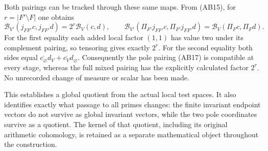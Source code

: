 Both pairings can be tracked through these same maps. From (AB15),
for $r=|F'\setminus F|$ one obtains
\[
 \mathscr B_{V'}(j_{FF'}c,j_{FF'}d)=2^r\mathscr B_V(c,d),
 \qquad
 \mathscr B_{V'}(\Pi_{F'}j_{FF'}c,\Pi_{F'}j_{FF'}d)
 =\mathscr B_V(\Pi_Fc,\Pi_Fd).
 \tag{AB24}
\]
For the first equality each added local factor $(1,1)$ has value two
under its complement pairing, so tensoring gives exactly $2^r$.
For the second equality both sides equal
$\overline{c_\varnothing}d_V+\overline{c_V}d_\varnothing$.
Consequently the pole pairing (AB17) is compatible at every stage,
whereas the full mixed pairing has the explicitly calculated factor
$2^r$. No unrecorded change of measure or scalar has been made.

This establishes a global quotient from the actual local test spaces.
It also identifies exactly what passage to all primes changes: the
finite invariant endpoint vectors do not survive as global invariant
vectors, while the two pole coordinates survive as a quotient. The
kernel of that quotient, including its original arithmetic cohomology,
is retained as a separate mathematical object throughout the construction.
